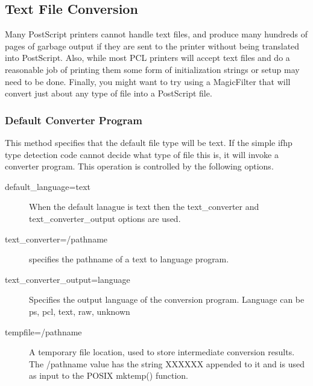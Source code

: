 \documentclass[a4paper]{article}
\begin{document}
\subsection{Text File Conversion
\label{textfile}
\label{default_language}
\label{file_util_path}
\label{text_converter}
\label{text_converter_output}
\label{text_tempfile}
\label{language}}

Many PostScript printers cannot handle text files,
and produce many hundreds of pages of garbage
output if they are sent to the printer without being translated
into PostScript.
Also,
while most PCL printers will accept text files and do a reasonable
job of printing them
some form of initialization strings or setup may need to be done.
Finally,
you might want to try using a
{\ttfamily MagicFilter}
that will convert just about any type of file into a PostScript file.


\subsubsection{Default Converter Program}

This method specifies that the default file type
will be
{\ttfamily text}.
If the simple {\ttfamily ifhp} type detection code cannot decide
what type of file this is,
it will invoke a converter program.
This operation is controlled by the following options.
\begin{description}
\item[{\ttfamily default\_language=text}] \mbox{}

When the default lanague is {\ttfamily text}
then the
{\ttfamily text\_converter} and
{\ttfamily text\_converter\_output} options are used.

\item[{\ttfamily text\_converter=/pathname}] \mbox{}

specifies the pathname of a text to language program.

\item[{\ttfamily text\_converter\_output=language}] \mbox{}

Specifies the output language of the conversion program.
Language can be
{\ttfamily ps},
{\ttfamily pcl},
{\ttfamily text},
{\ttfamily raw},
{\ttfamily unknown}

\item[{\ttfamily tempfile=/pathname}] \mbox{}

A temporary file location,  used to store
intermediate conversion results.
The
{\ttfamily /pathname}
value has the string
{\ttfamily XXXXXX}
appended to it and is used as input to the POSIX
{\ttfamily mktemp()}
function.

\end{description}
\end{document}

